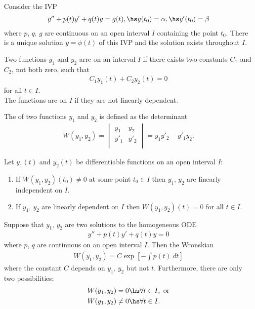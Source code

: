 \documentclass{article}
\begin{document}
\begin{theorem}
    Consider the IVP
    \begin{align*}
        y'' + p(t)y'+q(t)y=g(t),\hs y(t_0)=\alpha,\hs y'(t_0)=\beta
    \end{align*}
    where $p$, $q$, $g$ are continuous on an open interval $I$ containing
    the point $t_0$. There is a unique solution $y=\phi(t)$ of this IVP
    and the solution exists throughout $I$.
\end{theorem}
\begin{definition}
    Two functions $y_1$ and $y_2$ arre  on an
    interval $I$ if there exists two constants $C_1$ and $C_2$, not
    both zero, such that
    \begin{align*}
        C_1y_1(t)+C_2y_2(t)=0
    \end{align*}
    for all $t\in I$.\\
    The functions are  on $I$ if they are not
    linearly dependent.
\end{definition}
\begin{definition}
    The  of two functions $y_1$ and $y_2$ is defined as the
    determinant
    \begin{align*}
        W(y_1, y_2) = \begin{vmatrix}
            y_1 & y_2 \\
            y'_1& y'_2\\
        \end{vmatrix} = y_1y'_2 - y'_1y_2.
    \end{align*}
\end{definition}
\begin{theorem}
    Let $y_1(t)$ and $y_2(t)$ be differentiable functions on an open
    interval $I$:
    \begin{enumerate}
        \item If $W(y_1,y_2)(t_0)\not=0$ at some point $t_0\in I$ then $y_1$, $y_2$ are linearly independent on $I$.
        \item If $y_1$, $y_2$ are linearly dependent on $I$ then $W(y_1, y_2)(t)=0$ for all $t\in I$.
    \end{enumerate}
\end{theorem}
\begin{theorem}
    Suppose that $y_1$, $y_2$ are two solutions to the homogeneous ODE
    \begin{align*}
        y'' + p(t)y' + q(t)y = 0
    \end{align*} 
    where $p$, $q$ are continuous on an open interval $I$. Then the
    Wronskian
    \begin{align*}
        W(y_1, y_2) = C\exp \left[-\int p(t)\:dt\right]
    \end{align*}
    where the constant $C$ depends on $y_1$, $y_2$ but not $t$.
    Furthermore, there are only two possibilities:
    \begin{align*}
        W(y_1,y_2)&=0\hs \forall t \in I, \text{ or}\\
        W(y_1,y_2)&\not=0\hs \forall t \in I.
    \end{align*}
\end{theorem}
\end{document}
